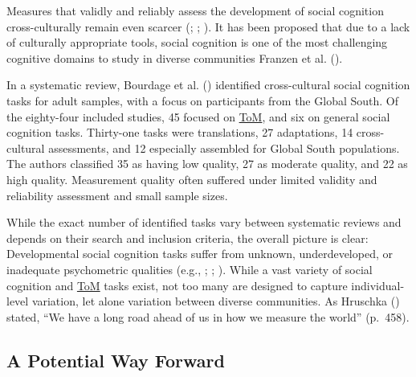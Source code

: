 \documentclass[
]{scrbook}
\begin{document}
Measures that validly and reliably assess the development of social cognition cross-culturally remain even scarcer (; ; ). It has been proposed that due to a lack of culturally appropriate tools, social cognition is one of the most challenging cognitive domains to study in diverse communities Franzen et al. ().

In a systematic review, Bourdage et al. () identified cross-cultural social cognition tasks for adult samples, with a focus on participants from the Global South. Of the eighty-four included studies, 45 focused on \hyperref[acronyms_ToM]{ToM}, and six on general social cognition tasks. Thirty-one tasks were translations, 27 adaptations, 14 cross-cultural assessments, and 12 especially assembled for Global South populations. The authors classified 35 as having low quality, 27 as moderate quality, and 22 as high quality. Measurement quality often suffered under limited validity and reliability assessment and small sample sizes.

While the exact number of identified tasks vary between systematic reviews and depends on their search and inclusion criteria, the overall picture is clear: Developmental social cognition tasks suffer from unknown, underdeveloped, or inadequate psychometric qualities (e.g., ; ; ). While a vast variety of social cognition and \hyperref[acronyms_ToM]{ToM} tasks exist, not too many are designed to capture individual-level variation, let alone variation between diverse communities. As Hruschka () stated, ``We have a long road ahead of us in how we measure the world'' (p.~458).

\subsection{A Potential Way Forward}\label{a-potential-way-forward}
\end{document}
